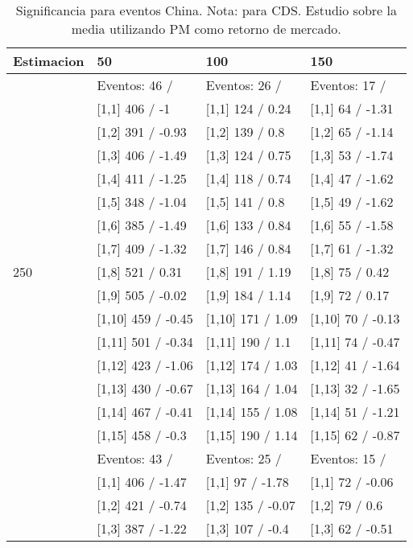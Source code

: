\begin{table}

\caption{Significancia para eventos China. Nota: para CDS. Estudio sobre la media utilizando PM como retorno de mercado.}
\centering
\begin{tabular}[t]{llll}
\toprule
Estimacion & 50 & 100 & 150\\
\midrule
 & Eventos:  46 / & Eventos:  26 / & Eventos:  17 /\\
 & {}[1,1] 406  / -1 & {}[1,1] 124  / 0.24 & {}[1,1] 64  / -1.31\\
 & {}[1,2] 391  / -0.93 & {}[1,2] 139  / 0.8 & {}[1,2] 65  / -1.14\\
 & {}[1,3] 406  / -1.49 & {}[1,3] 124  / 0.75 & {}[1,3] 53  / -1.74\\
 & {}[1,4] 411  / -1.25 & {}[1,4] 118  / 0.74 & {}[1,4] 47  / -1.62\\
\addlinespace
 & {}[1,5] 348  / -1.04 & {}[1,5] 141  / 0.8 & {}[1,5] 49  / -1.62\\
 & {}[1,6] 385  / -1.49 & {}[1,6] 133  / 0.84 & {}[1,6] 55  / -1.58\\
 & {}[1,7] 409  / -1.32 & {}[1,7] 146  / 0.84 & {}[1,7] 61  / -1.32\\
250 & {}[1,8] 521  / 0.31 & {}[1,8] 191  / 1.19 & {}[1,8] 75  / 0.42\\
 & {}[1,9] 505  / -0.02 & {}[1,9] 184  / 1.14 & {}[1,9] 72  / 0.17\\
\addlinespace
 & {}[1,10] 459  / -0.45 & {}[1,10] 171  / 1.09 & {}[1,10] 70  / -0.13\\
 & {}[1,11] 501  / -0.34 & {}[1,11] 190  / 1.1 & {}[1,11] 74  / -0.47\\
 & {}[1,12] 423  / -1.06 & {}[1,12] 174  / 1.03 & {}[1,12] 41  / -1.64\\
 & {}[1,13] 430  / -0.67 & {}[1,13] 164  / 1.04 & {}[1,13] 32  / -1.65\\
 & {}[1,14] 467  / -0.41 & {}[1,14] 155  / 1.08 & {}[1,14] 51  / -1.21\\
\addlinespace
 & {}[1,15] 458  / -0.3 & {}[1,15] 190  / 1.14 & {}[1,15] 62  / -0.87\\
 & Eventos:  43 / & Eventos:  25 / & Eventos:  15 /\\
 & {}[1,1] 406  / -1.47 & {}[1,1] 97  / -1.78 & {}[1,1] 72  / -0.06\\
 & {}[1,2] 421  / -0.74 & {}[1,2] 135  / -0.07 & {}[1,2] 79  / 0.6\\
 & {}[1,3] 387  / -1.22 & {}[1,3] 107  / -0.4 & {}[1,3] 62  / -0.51\\

\end{tabular}
\end{table}
